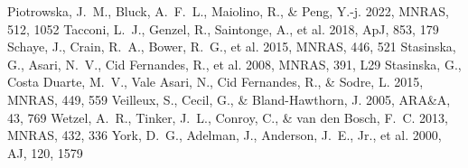 \documentclass[twocolumn]{aastex631}
\begin{document}
\begin{thebibliography}{}
 Piotrowska, J.~M., Bluck, A.~F.~L., Maiolino, R., \& Peng, Y.-j. 2022, MNRAS, 512, 1052
 Tacconi, L.~J., Genzel, R., Saintonge, A., et al. 2018, ApJ, 853, 179
 Schaye, J., Crain, R.~A., Bower, R.~G., et al. 2015, MNRAS, 446, 521
 Stasinska, G., Asari, N.~V., Cid Fernandes, R., et al. 2008, MNRAS, 391, L29
 Stasinska, G., Costa Duarte, M.~V., Vale Asari, N., Cid Fernandes, R., \& Sodre, L. 2015, MNRAS, 449, 559
 Veilleux, S., Cecil, G., \& Bland-Hawthorn, J. 2005, ARA\&A, 43, 769
 Wetzel, A.~R., Tinker, J.~L., Conroy, C., \& van den Bosch, F.~C. 2013, MNRAS, 432, 336
 York, D.~G., Adelman, J., Anderson, J.~E., Jr., et al. 2000, AJ, 120, 1579
\end{thebibliography}
\end{document}

